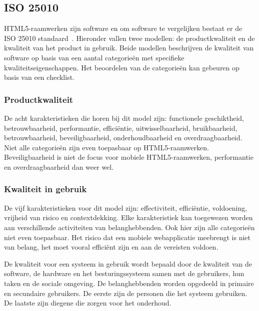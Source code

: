 \subsection{ISO 25010}
\label{sec:vergelijken-iso}

HTML5-raamwerken zijn software en om software te vergelijken bestaat er de ISO 25010 standaard~\cite{Standard2010}.  
Hieronder vallen twee modellen:  de productkwaliteit en de kwaliteit van het product in gebruik.  
Beide modellen beschrijven de kwaliteit van software op basis van een aantal categorieën met specifieke kwaliteitseigenschappen. 
Het beoordelen van de categorieën kan gebeuren op basis van een checklist. 
 
\subsubsection{Productkwaliteit}
De acht karakteristieken die horen bij dit model zijn: functionele geschiktheid,  betrouwbaarheid,  performantie, efficiëntie, uitwisselbaarheid,  bruikbaarheid,  betrouwbaarheid, beveiligbaarheid,  onderhoudbaarheid en overdraagbaarheid.   
Niet alle categorieën zijn even toepasbaar op HTML5-raamwerken.  
Beveiligbaarheid is niet de focus voor mobiele HTML5-raamwerken,  performantie en overdraagbaarheid dan weer wel.

\subsubsection{Kwaliteit in gebruik}
De vijf karakteristieken voor dit model zijn: effectiviteit,  efficiëntie,  voldoening,  vrijheid van risico en contextdekking. 
Elke karakteristiek kan toegewezen worden aan verschillende activiteiten van belanghebbenden. 
Ook hier zijn alle categorieën niet even toepasbaar.  
Het risico dat een mobiele webapplicatie meebrengt is niet van belang,  het moet vooral efficiënt zijn en aan de vereisten voldoen.

De kwaliteit voor een systeem in gebruik wordt bepaald door de kwaliteit van de software,  de hardware en het besturingssysteem samen met de gebruikers, hun taken en de sociale omgeving.  
De belanghebbenden worden opgedeeld in primaire en secundaire gebruikers.  
De eerste zijn de personen die het systeem gebruiken. 
De laatste zijn diegene die zorgen voor het onderhoud.

